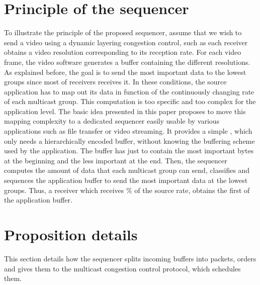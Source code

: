 \documentclass[a4paper]{article}
\begin{document}
\section{Principle of the sequencer}
    To illustrate the principle of the proposed sequencer, assume that we wish
    to send a video using a dynamic layering congestion control, such as each
    receiver obtains a video resolution corresponding to its reception rate.
    For each video frame, the video software generates a buffer containing the
    different resolutions.  As explained before, the goal is to send the most
    important data to the lowest groups since most of receivers receives it. In
    these conditions, the source application has to map out its data in function
    of the continuously changing rate of each multicast group.
This computation is too specific and too complex for the application level.
    The basic idea presented in this paper proposes to move this mapping
    complexity to a dedicated sequencer easily usable by various applications
    such as file transfer or video streaming.  It provides a simple , which
    only needs a hierarchically encoded buffer, without knowing the buffering
    scheme used by the application. The buffer has just to contain the most
    important bytes at the beginning and the less important at the end.
Then, the sequencer computes the amount of data that each multicast group
    can send, classifies and sequences the application buffer to send the most
    important data at the lowest groups.  Thus, a receiver which receives \%
    of the source rate, obtains the first  of the application buffer.

\section{Proposition details}
    This section details how the sequencer splits incoming buffers into
    packets, orders and gives them to the multicast congestion control protocol,
    which schedules them.
\end{document}
